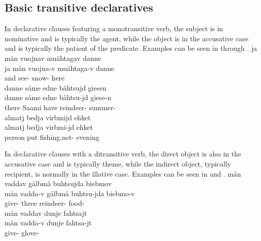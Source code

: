 \subsection{Basic transitive declaratives}\label{basicMonotransDeclaratives}
In declarative clauses featuring a monotransitive verb, %
the subject is in nominative and is typically the agent, while the object is in the accusative case and is typically the patient of the predicate. Examples can be seen in  through . 
\ea\label{basicMonotransDeclaratives1}
\glll	ja mån vuojnav muähtagav danne\\
	ja mån vuojna-v muähtaga-v danne\\
	and  see- snow- here\\\nopagebreak
{} 
\z
\ea\label{basicMonotransDeclaratives2}%
\glll	danne sáme edne båhtsujd giesen\\
	danne sáme edne båhtsu-jd giese-n\\
	there Saami\BS{} have\BS{} reindeer- summer- \\\nopagebreak
{} 
\z
\ea\label{basicMonotransDeclaratives3}
\glll	almatj bedja virbmijd ehket\\
	almatj bedja virbmi-jd ehket\\
	person\BS{} put\BS{} fishing.net- evening\\%
{} 
\z

In declarative clauses with a ditransitive verb, the direct object is also in the accusative case and is typically theme, while the indirect object, typically recipient, is normally in the illative case. Examples can be seen in  and . 
\ea\label{basicDitransDeclaratives1}
\glll	mån vaddav gålbmå buhtsujda biebmov\\
	mån vadda-v gålbmå buhtsu-jda biebmo-v\\
	 give- three reindeer- food-\\\nopagebreak
{} 
\z
\ea\label{basicDitransDeclaratives2}%
\glll	mån vaddav dunje fahtsajt\\
	mån vadda-v dunje fahtsa-jt\\
	 give-  glove- \\\nopagebreak
{} 
\z


